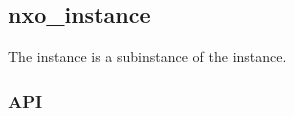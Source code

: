 %
%
%
%
%

\subsection{nxo\_instance}
\label{nxo_instance}

The  instance is a subinstance of the 
instance.

\subsubsection{API}
